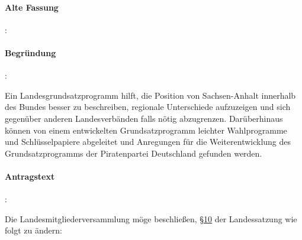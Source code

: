 \paragraph{Alte Fassung}:


\paragraph{Begründung}:

Ein Landesgrundsatzprogramm hilft, die Position von Sachsen-Anhalt innerhalb des Bundes besser zu beschreiben, regionale Unterschiede aufzuzeigen und sich gegenüber anderen Landesverbänden falls nötig abzugrenzen. Darüberhinaus können von einem entwickelten Grundsatzprogramm leichter Wahlprogramme und Schlüsselpapiere abgeleitet und Anregungen für die Weiterentwicklung des Grundsatzprogramms der Piratenpartei Deutschland gefunden werden.



\paragraph{Antragstext}:

Die Landesmitgliederversammlung möge beschließen, \href{http://wiki.piratenpartei.de/LSA:Satzung#.C2.A7_10_-_Bewerberaufstellung_f.C3.BCr_die_Wahlen_zu_Volksvertretungen}{§10} der Landessatzung wie folgt zu ändern: 

